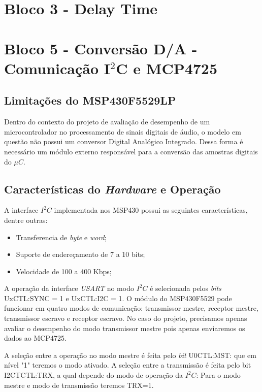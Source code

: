 		
\section{Bloco 3 - Delay Time}

\section{Bloco 5 - Conversão D/A - Comunicação I$^2$C e MCP4725}
	
	
	\subsection{Limitações do MSP430F5529LP}
		
		Dentro do contexto do projeto de avaliação de desempenho de um microcontrolador no processamento de sinais digitais de áudio, o modelo em questão não possui um conversor Digital Analógico Integrado. Dessa forma é necessário um módulo externo responsável para a conversão das amostras digitais do $\mu C$.
		
	\subsection{Características do \textit{Hardware} e Operação}
	
		A interface $ I^2C $ implementada nos MSP430 possui as seguintes características, dentre outras:
		\begin{itemize}
			\item Transferencia de \textit{byte} e \textit{word};
			\item Suporte de endereçamento de 7 a 10 bits;
			\item Velocidade de 100 a 400 Kbps;
		\end{itemize}
	
		A operação da interface \textit{USART} no modo $ I^2C $ é selecionada pelos \textit{bits} UxCTL:SYNC = 1 e UxCTL:I2C = 1. O módulo do MSP430F5529 pode funcionar em quatro modos de comunicação: transmissor mestre, receptor mestre, transmissor escravo e receptor escravo. No caso do projeto, precisamos apenas avaliar o desempenho do modo transmissor mestre pois apenas enviaremos os dados ao MCP4725.
		
		A seleção entre a operação no modo mestre é feita pelo \textit{bit} U0CTL:MST: que em nível "1" teremos o modo ativado. A seleção entre a transmissão é feita pelo bit I2CTCTL:TRX, a qual depende do modo de operação da $ I^2C $: Para o modo mestre e modo de transmissão teremos TRX=1.
		
